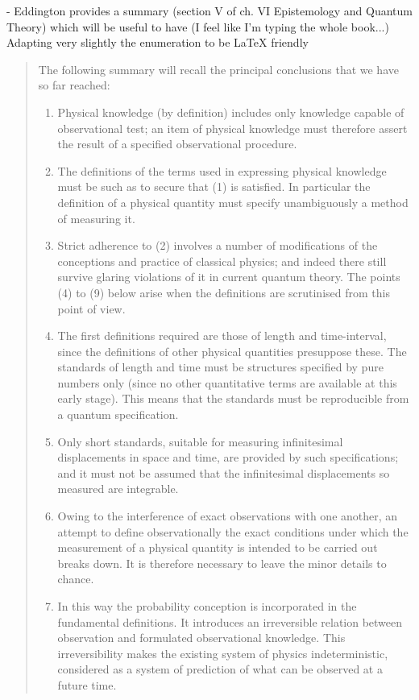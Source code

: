 - Eddington provides a summary (section V of ch. VI Epistemology and Quantum Theory) which will be useful to have (I feel like I'm typing the whole book...)  Adapting very slightly the enumeration to be LaTeX friendly

\begin{quote}
    The following summary will recall the principal conclusions that we have so far reached:
    \begin{enumerate}
        \item Physical knowledge (by definition) includes only knowledge capable of observational test; an item of physical knowledge must therefore assert the result of a specified observational procedure.
        \item The definitions of the terms used in expressing physical knowledge must be such as to secure that (1) is satisfied.  In particular the definition of a physical quantity must specify unambiguously a method of measuring it.  
        \item Strict adherence to (2) involves a number of modifications of the conceptions and practice of classical physics; and indeed there still survive glaring violations of it in current quantum theory.  The points (4) to (9) below arise when the definitions are scrutinised from this point of view.
        \item The first definitions required are those of length and time-interval, since the definitions of other physical quantities presuppose these.  The standards of length and time must be structures specified by pure numbers only (since no other quantitative terms are available at this early stage).  This means that the standards must be reproducible from a quantum specification.
        \item Only short standards, suitable for measuring infinitesimal displacements in space and time, are provided by such specifications; and it must not be assumed that the infinitesimal displacements so measured are integrable.
        \item Owing to the interference of exact observations with one another, an attempt to define observationally the exact conditions under which the measurement of a physical quantity is intended to be carried out breaks down.  It is therefore necessary to leave the minor details to chance.
        \item In this way the probability conception is incorporated in the fundamental definitions.  It introduces an irreversible relation between observation and formulated observational knowledge.  This irreversibility makes the existing system of physics indeterministic, considered as a system of prediction of what can be observed at a future time.

\end{enumerate}
\end{quote}
